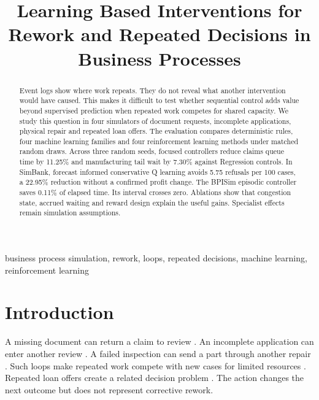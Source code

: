 \documentclass[conference]{IEEEtran}
\begin{document}

\title{Learning Based Interventions for Rework and Repeated Decisions in Business Processes}
\author{
}
\maketitle

\begin{abstract}
Event logs show where work repeats. They do not reveal what another intervention would have caused. This makes it difficult to test whether sequential control adds value beyond supervised prediction when repeated work competes for shared capacity. We study this question in four simulators of document requests, incomplete applications, physical repair and repeated loan offers. The evaluation compares deterministic rules, four machine learning families and four reinforcement learning methods under matched random draws. Across three random seeds, focused controllers reduce claims queue time by 11.25\% and manufacturing tail wait by 7.30\% against Regression controls. In SimBank, forecast informed conservative Q learning avoids 5.75 refusals per 100 cases, a 22.95\% reduction without a confirmed profit change. The BPISim episodic controller saves 0.11\% of elapsed time. Its interval crosses zero. Ablations show that congestion state, accrued waiting and reward design explain the useful gains. Specialist effects remain simulation assumptions.
\end{abstract}

\begin{IEEEkeywords}
business process simulation, rework, loops, repeated decisions, machine learning, reinforcement learning
\end{IEEEkeywords}

\section{Introduction}

A missing document can return a claim to review \cite{levich}. An incomplete application can enter another review \cite{bpi}. A failed inspection can send a part through another repair \cite{production}. Such loops make repeated work compete with new cases for limited resources \cite{lopez,shoush}. Repeated loan offers create a related decision problem \cite{simbank}. The action changes the next outcome but does not represent corrective rework.
\end{document}

